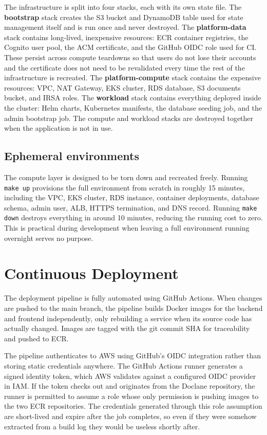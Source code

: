 \par The infrastructure is split into four stacks, each with its own state file. The \textbf{bootstrap} stack creates the S3 bucket and DynamoDB table used for state management itself and is run once and never destroyed. The \textbf{platform-data} stack contains long-lived, inexpensive resources: ECR container registries, the Cognito user pool, the ACM certificate, and the GitHub OIDC role used for CI. These persist across compute teardowns so that users do not lose their accounts and the certificate does not need to be revalidated every time the rest of the infrastructure is recreated. The \textbf{platform-compute} stack contains the expensive resources: VPC, NAT Gateway, EKS cluster, RDS database, S3 documents bucket, and IRSA roles. The \textbf{workload} stack contains everything deployed inside the cluster: Helm charts, Kubernetes manifests, the database seeding job, and the admin bootstrap job. The compute and workload stacks are destroyed together when the application is not in use.

\subsection{Ephemeral environments}

\par The compute layer is designed to be torn down and recreated freely. Running \texttt{make up} provisions the full environment from scratch in roughly 15 minutes, including the VPC, EKS cluster, RDS instance, container deployments, database schema, admin user, ALB, HTTPS termination, and DNS record. Running \texttt{make down} destroys everything in around 10 minutes, reducing the running cost to zero. This is practical during development when leaving a full environment running overnight serves no purpose.

\section{Continuous Deployment}

\par The deployment pipeline is fully automated using GitHub Actions. When changes are pushed to the main branch, the pipeline builds Docker images for the backend and frontend independently, only rebuilding a service when its source code has actually changed. Images are tagged with the git commit SHA for traceability and pushed to ECR.

\par The pipeline authenticates to AWS using GitHub's OIDC integration rather than storing static credentials anywhere. The GitHub Actions runner generates a signed identity token, which AWS validates against a configured OIDC provider in IAM. If the token checks out and originates from the Doclane repository, the runner is permitted to assume a role whose only permission is pushing images to the two ECR repositories. The credentials generated through this role assumption are short-lived and expire after the job completes, so even if they were somehow extracted from a build log they would be useless shortly after.